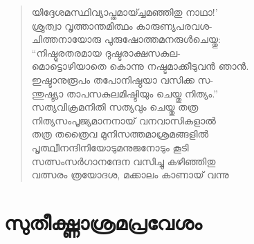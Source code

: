 \begin{verse}
യിദ്ദേശമസ്ഥിവ്യാപ്തമായ്ച്ചമഞ്ഞിതു നാഥാ!’\\
ശ്രുത്വാ വൃത്താന്തമിത്ഥം കാരുണ്യപരവശ-\\
ചിത്തനായോരു പുരുഷോത്തമനരുള്‍ചെയ്തു:\\
“നിഷ്ഠുരതരമായ ദുഷ്ടരാക്ഷസകുല-\\
മൊട്ടൊഴിയാതെ കൊന്നു നഷ്ടമാക്കീടുവന്‍ ഞാന്‍.\\
ഇഷ്ടാനുരൂപം തപോനിഷ്ഠയാ വസിക്ക സ-\\
ന്തുഷ്ട്യാ താപസകുലമിഷ്ടിയും ചെയ്തു നിത്യം.”\\
സത്യവിക്രമനിതി സത്യവും ചെയ്തു തത്ര\\
നിത്യസംപൂജ്യമാനനായ് വനവാസികളാല്‍\\
തത്ര തത്രൈവ മുനിസത്തമാശ്രമങ്ങളില്‍\\
പൃത്ഥ്വീനന്ദിനിയോടുമനുജനോടും കൂടി\\
സത്സംസര്‍ഗാനന്ദേന വസിച്ചു കഴിഞ്ഞിതു\\
വത്സരം ത്രയോദശ, മക്കാലം കാണായ് വന്നു
\end{verse}

\section{സുതീക്ഷ്ണാശ്രമപ്രവേശം}

